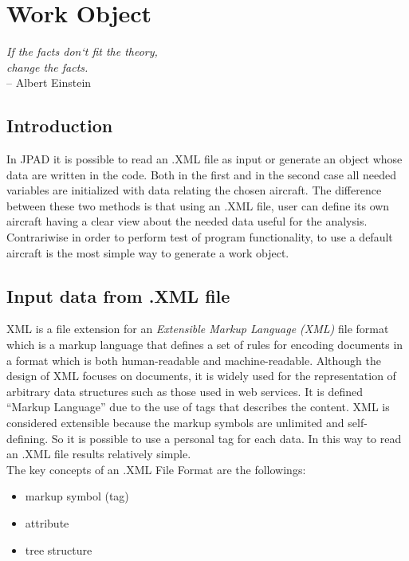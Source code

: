 \chapter{Work Object}%
\label{ch:workobject}
\begin{flushright}
	{\smaller
		\textit{If the facts don`t fit the theory,\\change the facts. }\\
		-- Albert Einstein}
\end{flushright}
\section {Introduction}
In JPAD it is possible to read an .XML file as input or generate an object whose data are written in the code. Both in the first and in the second case all needed variables are initialized with data relating the chosen aircraft. The difference between these two methods is that using an .XML file, user can define its own aircraft having a clear view about the needed data useful for the analysis.\\
Contrariwise in order to perform test of program functionality, to use a default aircraft is the most simple way to generate a work object.

\section {Input data from .XML file}
XML is a file extension for an {\itshape Extensible Markup Language (XML)} file format which is a markup language that defines a set of rules for encoding documents in a format which is both human-readable and machine-readable. Although the design of XML focuses on documents, it is widely used for the representation of arbitrary data structures such as those used in web services. It is defined ``Markup Language'' due to the use of tags that describes the content. XML is considered extensible because the markup symbols are unlimited and self-defining. So it is possible to use a personal tag for each data. In this way to read an .XML file results relatively simple.\cite{wiki:xml}\\
The key concepts of an .XML File Format are the followings:
\begin{itemize}
\item markup symbol (tag)
\item attribute
\item tree structure
\end{itemize}


